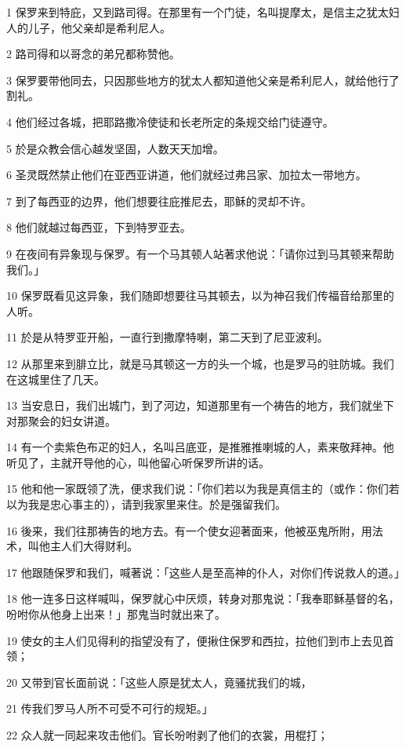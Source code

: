 \par 1 保罗来到特庇，又到路司得。在那里有一个门徒，名叫提摩太，是信主之犹太妇人的儿子，他父亲却是希利尼人。
\par 2 路司得和以哥念的弟兄都称赞他。
\par 3 保罗要带他同去，只因那些地方的犹太人都知道他父亲是希利尼人，就给他行了割礼。
\par 4 他们经过各城，把耶路撒冷使徒和长老所定的条规交给门徒遵守。
\par 5 於是众教会信心越发坚固，人数天天加增。
\par 6 圣灵既然禁止他们在亚西亚讲道，他们就经过弗吕家、加拉太一带地方。
\par 7 到了每西亚的边界，他们想要往庇推尼去，耶稣的灵却不许。
\par 8 他们就越过每西亚，下到特罗亚去。
\par 9 在夜间有异象现与保罗。有一个马其顿人站著求他说：「请你过到马其顿来帮助我们。」
\par 10 保罗既看见这异象，我们随即想要往马其顿去，以为神召我们传福音给那里的人听。
\par 11 於是从特罗亚开船，一直行到撒摩特喇，第二天到了尼亚波利。
\par 12 从那里来到腓立比，就是马其顿这一方的头一个城，也是罗马的驻防城。我们在这城里住了几天。
\par 13 当安息日，我们出城门，到了河边，知道那里有一个祷告的地方，我们就坐下对那聚会的妇女讲道。
\par 14 有一个卖紫色布疋的妇人，名叫吕底亚，是推雅推喇城的人，素来敬拜神。他听见了，主就开导他的心，叫他留心听保罗所讲的话。
\par 15 他和他一家既领了洗，便求我们说：「你们若以为我是真信主的（或作：你们若以为我是忠心事主的），请到我家里来住。於是强留我们。
\par 16 後来，我们往那祷告的地方去。有一个使女迎著面来，他被巫鬼所附，用法术，叫他主人们大得财利。
\par 17 他跟随保罗和我们，喊著说：「这些人是至高神的仆人，对你们传说救人的道。」
\par 18 他一连多日这样喊叫，保罗就心中厌烦，转身对那鬼说：「我奉耶稣基督的名，吩咐你从他身上出来！」那鬼当时就出来了。
\par 19 使女的主人们见得利的指望没有了，便揪住保罗和西拉，拉他们到市上去见首领；
\par 20 又带到官长面前说：「这些人原是犹太人，竟骚扰我们的城，
\par 21 传我们罗马人所不可受不可行的规矩。」
\par 22 众人就一同起来攻击他们。官长吩咐剥了他们的衣裳，用棍打；
